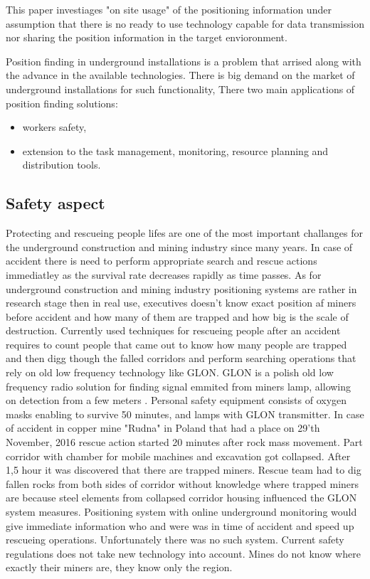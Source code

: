 \documentclass[../main.tex]{subfiles}
\begin{document}
This paper investiages "on site usage" of the positioning information under assumption that there is no ready to use technology capable for data transmission nor sharing the position information in the target envioronment.

Position finding in underground installations is a problem that arrised along with the advance in the available technologies. There is big demand on the market of underground installations for such functionality, There two main applications of position finding solutions:
\begin{itemize}
	\item workers safety,
	\item extension to the task management, monitoring, resource planning and distribution tools.
\end{itemize}


\subsection{Safety aspect} %
\label{sub:safety_aspect}

Protecting and rescueing people lifes are one of the most important challanges for the underground construction and mining industry since many years. In case of accident there is need to perform appropriate search and rescue actions immediatley as the survival rate decreases rapidly as time passes. As for underground construction and mining industry positioning systems are rather in research stage then in real use, executives doesn't know exact position af miners before accident and how many of them are trapped and how big is the scale of destruction. Currently used techniques for rescueing people after an accident requires to count people that came out to know how many people are trapped and then digg though the falled corridors and perform searching operations that rely on old low frequency technology like GLON. GLON is a polish old low frequency radio solution for finding signal emmited from miners lamp, allowing on detection from a few meters \cite{GLON}. Personal safety equipment consists of oxygen masks enabling to survive 50 minutes, and lamps with GLON transmitter. In case of accident in copper mine "Rudna" in Poland that had a place on 29'th November, 2016  \cite{newspaper_rudna} rescue action started 20 minutes after rock mass movement. Part corridor with chamber for mobile machines and excavation got collapsed. After 1,5 hour it was discovered that there are trapped miners. Rescue team had to dig fallen rocks from both sides of corridor without knowledge where trapped miners are because steel elements from collapsed corridor housing influenced the GLON system measures. Positioning system with online underground monitoring would give immediate information who and were was in time of accident and speed up rescueing operations. Unfortunately there was no such system. Current safety regulations does not take new technology into account. Mines do not know where exactly their miners are, they know only the region.
\end{document}
